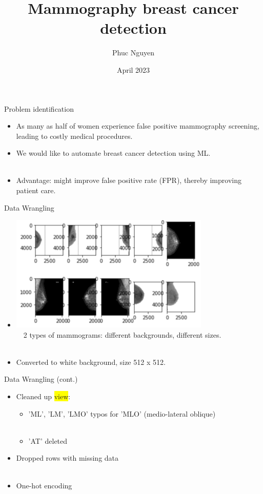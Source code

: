 \documentclass[14pt]{beamer}
\title[Short title]{Mammography breast cancer detection}
\author{Phuc Nguyen} %
\date{April 2023} %
\begin{document}
\begin{frame}
\titlepage %
\end{frame}


\begin{frame}{\small Problem identification}
    \begin{itemize}
        \item As many as half of women experience false positive mammography screening, leading to costly medical procedures.
        \item We would like to automate breast cancer detection using ML. \\~\
        \item Advantage: might improve false positive rate (FPR), thereby improving patient care.
    \end{itemize}
\end{frame}

\begin{frame}{\small Data Wrangling}
\begin{itemize}
    \item 
    \includegraphics[width=0.75\textwidth]{RawMammograms}\\~\
    2 types of mammograms: different backgrounds, different sizes.\\~\
    \item Converted to white background, size 512 x 512.
\end{itemize}
\end{frame}

\begin{frame}{\small Data Wrangling (cont.)}
\begin{itemize}
    \item Cleaned up \colorbox{yellow}{view}:
    \begin{itemize}
        \item 'ML', 'LM', 'LMO' typos for 'MLO' (medio-lateral oblique)\\~\
        \item 'AT' deleted
    \end{itemize}

    \item Dropped rows with missing data\\~\
    
    \item One-hot encoding
    
\end{itemize}
\end{frame}
\end{document}
